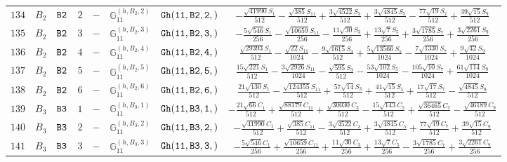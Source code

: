 \documentclass[fleqn,8pt]{jsarticle}
\begin{document}
\begin{table}[ht!]
\begin{center}
\begin{tabular}{cccccccc}
$ 134 $ & $ B_{2} $ & $ {\tt B2} $ & $ 2 $ & $ - $ & $ \mathbb{G}_{11}^{(h,B_{2},2)} $ & $ {\tt Gh(11,B2,2,)} $ & $ - \frac{\sqrt{41990} S_{1}}{512} - \frac{\sqrt{385} S_{11}}{512} + \frac{3 \sqrt{4522} S_{3}}{512} + \frac{3 \sqrt{4845} S_{5}}{512} - \frac{77 \sqrt{19} S_{7}}{512} + \frac{39 \sqrt{15} S_{9}}{512} $ \\
$ 135 $ & $ B_{2} $ & $ {\tt B2} $ & $ 3 $ & $ - $ & $ \mathbb{G}_{11}^{(h,B_{2},3)} $ & $ {\tt Gh(11,B2,3,)} $ & $ - \frac{5 \sqrt{546} S_{1}}{256} - \frac{\sqrt{10659} S_{11}}{256} - \frac{11 \sqrt{30} S_{3}}{256} + \frac{13 \sqrt{7} S_{5}}{256} + \frac{3 \sqrt{1785} S_{7}}{256} + \frac{3 \sqrt{2261} S_{9}}{256} $ \\
$ 136 $ & $ B_{2} $ & $ {\tt B2} $ & $ 4 $ & $ - $ & $ \mathbb{G}_{11}^{(h,B_{2},4)} $ & $ {\tt Gh(11,B2,4,)} $ & $ \frac{\sqrt{29393} S_{1}}{512} - \frac{\sqrt{22} S_{11}}{1024} - \frac{9 \sqrt{1615} S_{3}}{512} + \frac{5 \sqrt{13566} S_{5}}{1024} - \frac{7 \sqrt{1330} S_{7}}{1024} + \frac{9 \sqrt{42} S_{9}}{1024} $ \\
$ 137 $ & $ B_{2} $ & $ {\tt B2} $ & $ 5 $ & $ - $ & $ \mathbb{G}_{11}^{(h,B_{2},5)} $ & $ {\tt Gh(11,B2,5,)} $ & $ \frac{15 \sqrt{221} S_{1}}{512} - \frac{3 \sqrt{2926} S_{11}}{1024} - \frac{\sqrt{595} S_{3}}{512} - \frac{53 \sqrt{102} S_{5}}{1024} - \frac{105 \sqrt{10} S_{7}}{1024} + \frac{61 \sqrt{114} S_{9}}{1024} $ \\
$ 138 $ & $ B_{2} $ & $ {\tt B2} $ & $ 6 $ & $ - $ & $ \mathbb{G}_{11}^{(h,B_{2},6)} $ & $ {\tt Gh(11,B2,6,)} $ & $ \frac{21 \sqrt{130} S_{1}}{512} - \frac{\sqrt{124355} S_{11}}{512} + \frac{57 \sqrt{14} S_{3}}{512} + \frac{41 \sqrt{15} S_{5}}{512} + \frac{17 \sqrt{17} S_{7}}{512} - \frac{\sqrt{4845} S_{9}}{512} $ \\
$ 139 $ & $ B_{3} $ & $ {\tt B3} $ & $ 1 $ & $ - $ & $ \mathbb{G}_{11}^{(h,B_{3},1)} $ & $ {\tt Gh(11,B3,1,)} $ & $ - \frac{21 \sqrt{66} C_{1}}{512} + \frac{\sqrt{88179} C_{11}}{512} + \frac{\sqrt{30030} C_{3}}{512} - \frac{15 \sqrt{143} C_{5}}{512} + \frac{\sqrt{36465} C_{7}}{512} - \frac{\sqrt{46189} C_{9}}{512} $ \\
$ 140 $ & $ B_{3} $ & $ {\tt B3} $ & $ 2 $ & $ - $ & $ \mathbb{G}_{11}^{(h,B_{3},2)} $ & $ {\tt Gh(11,B3,2,)} $ & $ - \frac{\sqrt{41990} C_{1}}{512} + \frac{\sqrt{385} C_{11}}{512} - \frac{3 \sqrt{4522} C_{3}}{512} + \frac{3 \sqrt{4845} C_{5}}{512} + \frac{77 \sqrt{19} C_{7}}{512} + \frac{39 \sqrt{15} C_{9}}{512} $ \\
$ 141 $ & $ B_{3} $ & $ {\tt B3} $ & $ 3 $ & $ - $ & $ \mathbb{G}_{11}^{(h,B_{3},3)} $ & $ {\tt Gh(11,B3,3,)} $ & $ - \frac{5 \sqrt{546} C_{1}}{256} + \frac{\sqrt{10659} C_{11}}{256} + \frac{11 \sqrt{30} C_{3}}{256} + \frac{13 \sqrt{7} C_{5}}{256} - \frac{3 \sqrt{1785} C_{7}}{256} + \frac{3 \sqrt{2261} C_{9}}{256} $ \\

\end{tabular}
\end{center}
\end{table}
\end{document}
